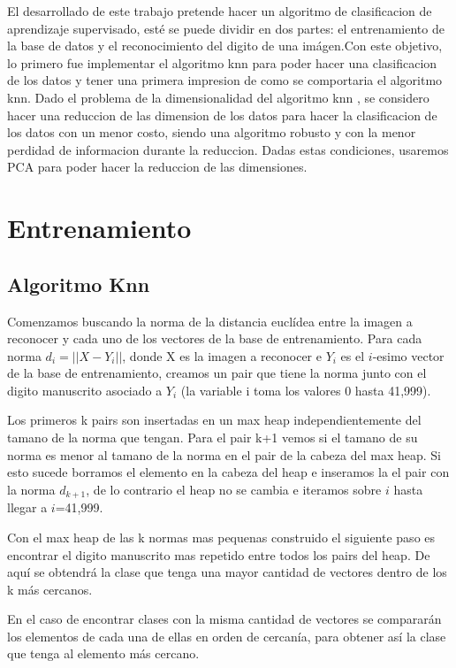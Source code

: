 El desarrollado de este trabajo pretende hacer un algoritmo de clasificacion de
aprendizaje supervisado, esté se puede dividir en dos partes: el entrenamiento
de la base de datos y el reconocimiento del digito de una imágen.Con este
objetivo, lo primero fue implementar el algoritmo knn para poder hacer una
clasificacion de los datos y tener una primera impresion de como se comportaria
el algoritmo knn. Dado el problema de la dimensionalidad del algoritmo knn , se
considero hacer una reduccion de las dimension de los datos para hacer la
clasificacion de los datos con un menor costo, siendo una algoritmo robusto y
con la menor perdidad de informacion durante la reduccion. Dadas estas
condiciones, usaremos PCA para poder hacer la reduccion de las dimensiones.  


\section{Entrenamiento}

\subsection{Algoritmo Knn}
Comenzamos buscando la norma de la distancia euclídea entre la imagen a reconocer y cada uno de los vectores de la base de entrenamiento. Para cada norma $d_{i}=||X-Y_{i}||$, donde X es la imagen a reconocer e $Y_{i}$ es el $i$-esimo vector de la base de entrenamiento, creamos un pair que tiene la norma junto con el digito manuscrito asociado a $Y_{i}$ (la variable i toma los valores 0 hasta 41,999).\par
\indent Los primeros k pairs son insertadas en un max heap independientemente del tamano de la norma que tengan. Para el pair k+1 vemos si el tamano de su norma es menor al tamano de la norma en el pair de la cabeza del max heap. Si esto sucede borramos el elemento en la cabeza del heap e inseramos la el pair con la norma $d_{k+1}$, de lo contrario el heap no se cambia e iteramos sobre $i$ hasta llegar a $i$=41,999. \par
\indent Con el max heap de las k normas mas pequenas construido el siguiente paso es encontrar el digito manuscrito mas repetido entre todos los pairs del heap. De aquí se obtendrá la clase que tenga una mayor cantidad de vectores dentro de los k más cercanos.\par
\indent En el caso de encontrar clases con la misma cantidad de vectores se compararán los elementos de cada una de ellas en orden de cercanía, para obtener así la clase que tenga al elemento más cercano.\par

